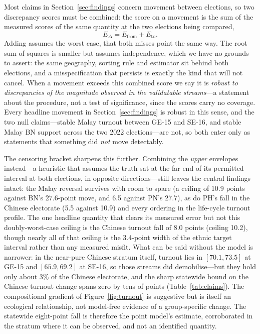 \documentclass[11pt]{article}
\begin{document}
Most claims in Section~\ref{sec:findings} concern movement between elections, so two discrepancy scores must be combined: the score on a movement is the sum of the measured scores of the same quantity at the two elections being compared,
\begin{equation}
	E_{\Delta} = E_{\text{from}} + E_{\text{to}}.
	\label{eq:combine}
\end{equation}
Adding assumes the worst case, that both misses point the same way. The root sum of squares is smaller but assumes independence, which we have no grounds to assert: the same geography, sorting rule and estimator sit behind both elections, and a misspecification that persists is exactly the kind that will not cancel. When a movement exceeds this combined score we say it is \emph{robust to discrepancies of the magnitude observed in the validatable streams}---a statement about the procedure, not a test of significance, since the scores carry no coverage. Every headline movement in Section~\ref{sec:findings} is robust in this sense, and the two null claims---stable Malay turnout between GE-15 and SE-16, and stable Malay BN support across the two 2022 elections---are not, so both enter only as statements that something did \emph{not} move detectably.

The censoring bracket sharpens this further. Combining the \emph{upper} envelopes instead---a heuristic that assumes the truth sat at the far end of its permitted interval at both elections, in opposite directions---still leaves the central findings intact: the Malay reversal survives with room to spare (a ceiling of 10.9 points against BN's 27.6-point move, and 6.5 against PN's 27.7), as do PH's fall in the Chinese electorate (5.5 against 10.9) and every ordering in the life-cycle turnout profile. The one headline quantity that clears its measured error but not this doubly-worst-case ceiling is the Chinese turnout fall of 8.0 points (ceiling 10.2), though nearly all of that ceiling is the 3.4-point width of the ethnic target interval rather than any measured misfit. What can be said without the model is narrower: in the near-pure Chinese stratum itself, turnout lies in $[70.1, 73.5]$ at GE-15 and $[65.9, 69.2]$ at SE-16, so those streams did demobilise---but they hold only about 3\% of the Chinese electorate, and the sharp statewide bound on the Chinese turnout change spans zero by tens of points (Table~\ref{tab:claims}). The compositional gradient of Figure~\ref{fig:turnout} is suggestive but is itself an ecological relationship, not model-free evidence of a group-specific change. The statewide eight-point fall is therefore the point model's estimate, corroborated in the stratum where it can be observed, and not an identified quantity.
\end{document}

